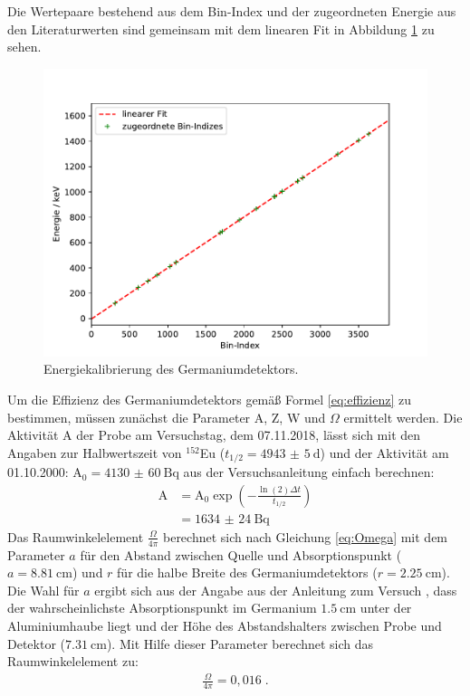 \noindent Die Wertepaare bestehend aus dem Bin-Index und der zugeordneten Energie aus den Literaturwerten sind gemeinsam mit dem linearen Fit in Abbildung \ref{abb:linfit} zu sehen.

\FloatBarrier
\begin{figure}
    \centering
    \includegraphics[scale=0.7]{Kalibrierung.pdf}
    \caption{Energiekalibrierung des Germaniumdetektors.}
    \label{abb:linfit}
\end{figure}
\FloatBarrier

\noindent Um die Effizienz des Germaniumdetektors gemäß Formel \ref{eq:effizienz} zu bestimmen, müssen
zunächst die Parameter A, Z, W und $\Omega$ ermittelt werden.
Die Aktivität A der Probe am Versuchstag, dem 07.11.2018, lässt sich mit den Angaben zur Halbwertszeit von
$^{152}$Eu ($t_{1/2}=\SI{4943(5)}{\day}$) und der Aktivität am 01.10.2000: $\text{A}_0=
\SI{4130(60)}{\becquerel}$ aus der Versuchsanleitung \cite{Q1} einfach berechnen:
\begin{align*}
    \text{A} &= \text{A}_0 \exp \left(-\frac{\ln(2) \Delta t}{t_{1/2}}\right) \\
    &= \SI{1634(24)}{\becquerel}
\end{align*}
Das Raumwinkelelement $\frac{\Omega}{4 \pi}$ berechnet sich nach Gleichung \ref{eq:Omega} mit dem Parameter
$a$ für den Abstand zwischen Quelle und Absorptionspunkt ($a=\SI{8,81}{\centi\meter}$) und $r$ für die halbe
Breite des Germaniumdetektors ($r= \SI{2,25}{\centi \meter}$). Die Wahl für $a$ ergibt sich aus der Angabe
aus der Anleitung zum Versuch \cite{Q1}, dass der wahrscheinlichste Absorptionspunkt im Germanium
$\SI{1,5}{\centi \meter}$ unter der Aluminiumhaube liegt und der Höhe des Abstandshalters zwischen Probe und
Detektor ($\SI{7,31}{\centi \meter}$).
Mit Hilfe dieser Parameter berechnet sich das Raumwinkelelement zu:
\begin{align*}
    \frac{\Omega}{4 \pi} = 0,016 \; .
\end{align*}

